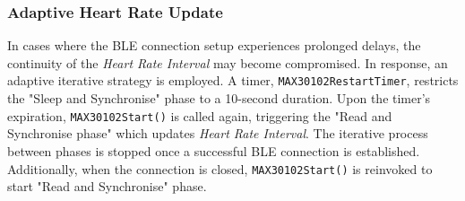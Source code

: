 \subsubsection{Adaptive Heart Rate Update}
In cases where the BLE connection setup experiences prolonged delays, the continuity of the \textit{Heart Rate Interval} may become compromised. In response, an adaptive iterative strategy is employed. A timer, \texttt{MAX30102RestartTimer}, restricts the "Sleep and Synchronise" phase to a 10-second duration. Upon the timer's expiration, \texttt{MAX30102Start()} is called again, triggering the "Read and Synchronise phase" which updates \textit{Heart Rate Interval}. The iterative process between phases is stopped once a successful BLE connection is established. Additionally, when the connection is closed, \texttt{MAX30102Start()} is reinvoked to start "Read and Synchronise" phase. 
